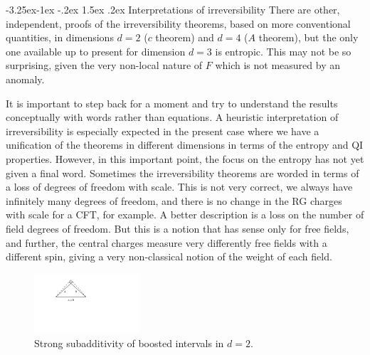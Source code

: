 \documentclass[11pt,a4paper]{article}
\makeatletter
\renewcommand\subsection{\@startsection{subsection}{2}{\z@}%
                                   {-3.25ex\@plus -1ex \@minus -.2ex}%
                                     {1.5ex \@plus .2ex}%
                                     {\normalfont\bfseries}}
\numberwithin{equation}{section}
\makeatother
\begin{document}
\subsection{Interpretations of irreversibility}
There are other, independent, proofs of the irreversibility theorems, based on more conventional quantities,  in dimensions $d=2$ ($c$ theorem) and $d=4$ ($A$ theorem), but the only one available up to present for dimension $d=3$ is entropic. This may not be so surprising, given the very non-local nature of $F$ which is not measured by an anomaly. 

It is important to step back for a moment and try to understand the results conceptually with words rather than equations. A heuristic interpretation of irreversibility is especially expected in the present case where we have a unification of the theorems in different dimensions in terms of the entropy and QI properties. However, in this important point, the focus on the entropy has not yet given a final word. 
Sometimes the irreversibility theorems are worded in terms of a loss of degrees of freedom with scale. This is not very correct, we always have infinitely many degrees of freedom, and there is no change in the RG charges with scale for a CFT, for example. A better description is a loss on the number of field degrees of freedom. But this is a notion that has sense only for free fields, and further, the central charges measure very differently free fields with a different spin, giving a very non-classical notion of the weight of each field.   

\begin{figure}[t]
\begin{center}
\includegraphics[width=0.35\textwidth]{triangulo.pdf} 
\caption{Strong subadditivity of boosted intervals in $d=2$.}
\label{triangle}
\end{center}
\end{figure}
\end{document}
